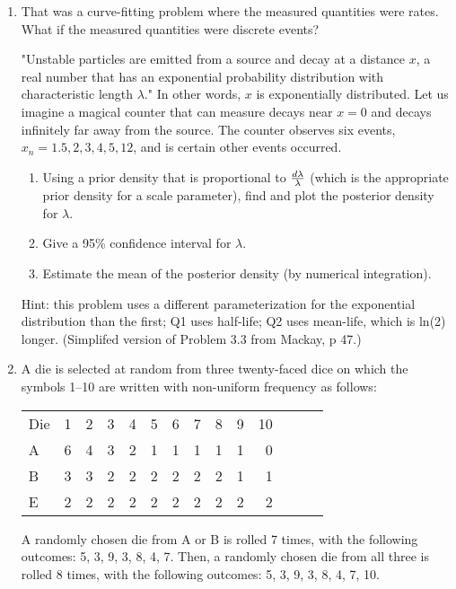 \documentclass[12pt]{book}
\theoremstyle{definition}
\begin{document}
\begin{enumerate}
\item
That was a curve-fitting problem where the measured quantities were rates.  What if the measured quantities were discrete events?

"Unstable particles are emitted from a source and decay at a distance $x$, a real number that has an exponential probability distribution with characteristic length $\lambda$."  In other words, $x$ is exponentially distributed. Let us imagine a magical counter that can measure decays near $x=0$ and decays infinitely far away from the source. The counter observes six events, ${x_n} =  {1.5,2,3,4,5,12}$, and is certain other events occurred. 

\begin{enumerate}[label=\alph*)]
  \item 	Using a prior density that is proportional to ${d\lambda }\over {\lambda}$ (which is the appropriate prior density for a scale parameter), find and plot the posterior density for $\lambda$. 
  \item  Give a 95\% confidence interval for $\lambda$.
  \item  Estimate the mean of the posterior density (by numerical integration).
\end{enumerate}
Hint:  this problem uses a different parameterization for the exponential distribution than the first; Q1 uses half-life; Q2 uses mean-life, which is ln(2) longer. 
(Simplifed version of Problem 3.3 from Mackay, p 47.)

\item\label{loadeddie} A die is selected at random from three twenty-faced dice on which the symbols 1–10 are written with non-uniform frequency as follows: 

\begin{tabular} {l r r r r r r r r r r r r r}
Die & 1 & 2 & 3 & 4 & 5 & 6 & 7 & 8 & 9 & 10 \\
A & 6 & 4 & 3 & 2 & 1 & 1 & 1 & 1 & 1 & 0  \\
B & 3 & 3 & 2 & 2 & 2 & 2 & 2 & 2 & 1 & 1 \\
E & 2 & 2 & 2 & 2 & 2 & 2 & 2 & 2 & 2 & 2 \\
\end{tabular}

A randomly chosen die from A or B is rolled 7 times, with the following outcomes: 5, 3, 9, 3, 8, 4, 7. Then, a randomly chosen die from all three is rolled 8 times, with the following outcomes: 5, 3, 9, 3, 8, 4, 7, 10. 


\end{enumerate}
\end{document}
